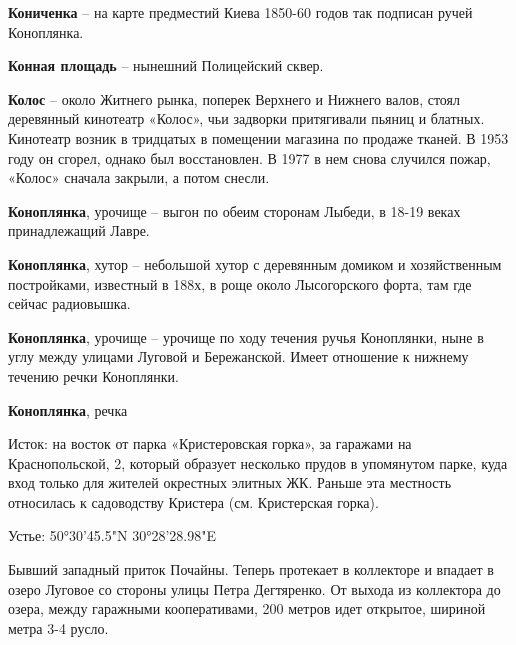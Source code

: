 \medskip


\textbf{Кониченка} – на карте предместий Киева 1850-60 годов так подписан ручей Коноплянка.\\

\medskip

\textbf{Конная площадь} – нынешний Полицейский сквер.\\

\medskip

\textbf{Колос} – около Житнего рынка, поперек Верхнего и Нижнего валов, стоял деревянный кинотеатр «Колос», чьи задворки притягивали пьяниц и блатных. Кинотеатр возник в тридцатых в помещении магазина по продаже тканей. В 1953 году он сгорел, однако был восстановлен. В 1977 в нем снова случился пожар, «Колос» сначала закрыли, а потом снесли.\\

\medskip

\textbf{Коноплянка}, урочище – выгон по обеим сторонам Лыбеди, в 18-19 веках принадлежащий Лавре.\\

\medskip

\textbf{Коноплянка}, хутор – небольшой хутор с деревянным домиком и хозяйственным постройками, известный в 188х, в роще около Лысогорского форта, там где сейчас радиовышка.\\  

\medskip

\textbf{Коноплянка}, урочище – урочище по ходу течения ручья Коноплянки, ныне в углу между улицами Луговой и Бережанской. Имеет отношение к нижнему течению речки Коноплянки.\\

\medskip

\textbf{Коноплянка}, речка

Исток: на восток от парка «Кристеровская горка», за гаражами на Краснопольской, 2, который образует несколько прудов в упомянутом парке, куда вход только для жителей окрестных элитных ЖК. Раньше эта местность относилась к садоводству Кристера (см. Кристерская горка).

Устье: 50°30'45.5"N 30°28'28.98"E

Бывший западный приток Почайны. Теперь протекает в коллекторе и впадает в озеро Луговое со стороны улицы Петра Дегтяренко. От выхода из коллектора до озера, между гаражными кооперативами, 200 метров идет открытое, шириной метра 3-4 русло.\\

\medskip

